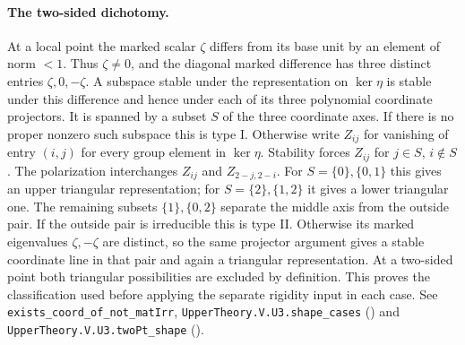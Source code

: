 \paragraph{The two-sided dichotomy.}
At a local point the marked scalar $\zeta$ differs from its base
unit by an element of norm $<1$. Thus $\zeta\ne0$, and the diagonal
marked difference has three distinct entries $\zeta,0,-\zeta$. A
subspace stable under the representation on $\ker\eta$ is stable under
this difference and hence under each of its three polynomial coordinate
projectors. It is spanned by a subset $S$ of the three coordinate axes.
If there is no proper nonzero such subspace this is type I. Otherwise
write $Z_{ij}$ for vanishing of entry $(i,j)$ for every group element
in $\ker\eta$. Stability forces $Z_{ij}$ for $j\in S$, $i\notin S$.
The polarization interchanges $Z_{ij}$ and $Z_{2-j,2-i}$.
For $S=\{0\},\{0,1\}$ this gives an upper triangular representation;
for $S=\{2\},\{1,2\}$ it gives a lower triangular one. The remaining
subsets $\{1\},\{0,2\}$ separate the middle axis from the outside
pair. If the outside pair is irreducible this is type II. Otherwise
its marked eigenvalues $\zeta,-\zeta$ are distinct, so the same
projector argument gives a stable coordinate line in that pair and
again a triangular representation. At a two-sided point both triangular
possibilities are excluded by definition. This proves the classification
used before applying the separate rigidity input in each case.
See \nolinkurl{exists_coord_of_not_matIrr}, \nolinkurl{UpperTheory.V.U3.shape_cases}
() and
\nolinkurl{UpperTheory.V.U3.twoPt_shape} ().

